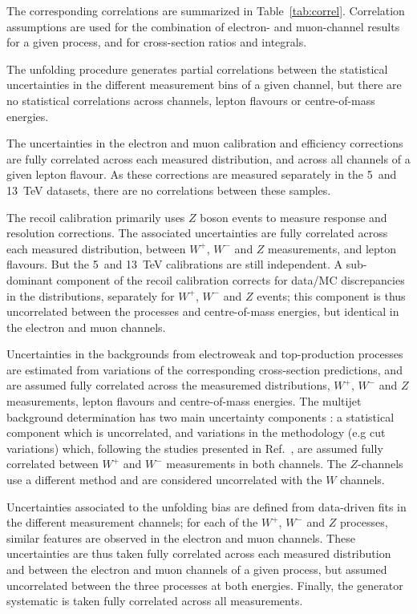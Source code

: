 The corresponding correlations are summarized in Table~\ref{tab:correl}. Correlation assumptions are used for the combination of electron- and muon-channel results for a given process, and for cross-section ratios and integrals.

The unfolding procedure generates partial correlations between the statistical uncertainties in the different measurement bins of a given channel, but there are no statistical correlations across channels, lepton flavours or centre-of-mass energies.

The uncertainties in the electron and muon calibration and efficiency corrections are fully correlated across each measured distribution, and across all channels of a given lepton flavour. As these corrections are measured separately in the 5~and 13~TeV datasets, there are no correlations between these samples.

The recoil calibration primarily uses $Z$ boson events to measure response and resolution corrections. The associated uncertainties are fully correlated across each measured distribution, between $W^+$, $W^-$ and $Z$ measurements, and lepton flavours. But the 5~and 13~TeV calibrations are still independent. A sub-dominant component of the recoil calibration corrects for data/MC discrepancies in the \setue distributions, separately for $W^+$, $W^-$ and $Z$ events; this component is thus uncorrelated between the processes and centre-of-mass energies, but identical in the electron and muon channels.

Uncertainties in the backgrounds from electroweak and top-production processes are estimated from variations of the corresponding cross-section predictions, and are assumed fully correlated across the measuremed distributions, $W^+$, $W^-$ and $Z$ measurements, lepton flavours and centre-of-mass energies. The multijet background determination has two main uncertainty components : a statistical component which is uncorrelated, and variations in the methodology (e.g cut variations) which, following the studies presented in Ref.~\cite{Xu:2657146}, are assumed fully correlated between $W^+$ and $W^-$ measurements in both channels. The $Z$-channels use a different method and are considered uncorrelated with the $W$ channels.

Uncertainties associated to the unfolding bias are defined from data-driven fits in the different measurement channels; for each of the $W^+$, $W^-$ and $Z$ processes, similar features are observed in the electron and muon channels. These uncertainties are thus taken fully correlated across each measured distribution and between the electron and muon channels of a given process, but assumed uncorrelated between the three processes at both energies. Finally, the generator systematic is taken fully correlated across all measurements.


